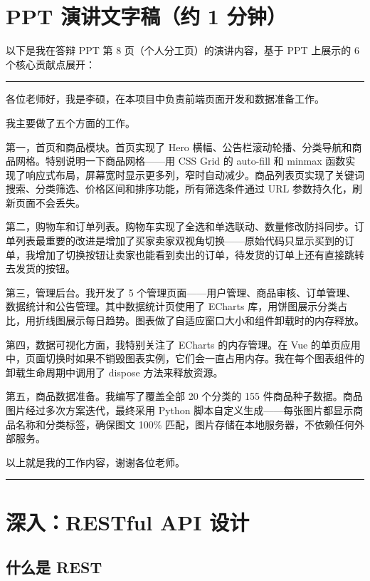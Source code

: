 \documentclass[12pt,a4paper]{ctexart}
\begin{document}
\section{PPT 演讲文字稿（约 1 分钟）}

以下是我在答辩 PPT 第 8 页（个人分工页）的演讲内容，基于 PPT 上展示的 6 个核心贡献点展开：

\medskip
\noindent\rule{\textwidth}{0.4pt}
\medskip

各位老师好，我是李硕，在本项目中负责前端页面开发和数据准备工作。

我主要做了五个方面的工作。

第一，首页和商品模块。首页实现了 Hero 横幅、公告栏滚动轮播、分类导航和商品网格。特别说明一下商品网格——用 CSS Grid 的 auto-fill 和 minmax 函数实现了响应式布局，屏幕宽时显示更多列，窄时自动减少。商品列表页实现了关键词搜索、分类筛选、价格区间和排序功能，所有筛选条件通过 URL 参数持久化，刷新页面不会丢失。

第二，购物车和订单列表。购物车实现了全选和单选联动、数量修改防抖同步。订单列表最重要的改进是增加了买家卖家双视角切换——原始代码只显示买到的订单，我增加了切换按钮让卖家也能看到卖出的订单，待发货的订单上还有直接跳转去发货的按钮。

第三，管理后台。我开发了 5 个管理页面——用户管理、商品审核、订单管理、数据统计和公告管理。其中数据统计页使用了 ECharts 库，用饼图展示分类占比，用折线图展示每日趋势。图表做了自适应窗口大小和组件卸载时的内存释放。

第四，数据可视化方面，我特别关注了 ECharts 的内存管理。在 Vue 的单页应用中，页面切换时如果不销毁图表实例，它们会一直占用内存。我在每个图表组件的卸载生命周期中调用了 dispose 方法来释放资源。

第五，商品数据准备。我编写了覆盖全部 20 个分类的 155 件商品种子数据。商品图片经过多次方案迭代，最终采用 Python 脚本自定义生成——每张图片都显示商品名称和分类标签，确保图文 100\% 匹配，图片存储在本地服务器，不依赖任何外部服务。

以上就是我的工作内容，谢谢各位老师。

\medskip
\noindent\rule{\textwidth}{0.4pt}
\medskip

\section{深入：RESTful API 设计}

\subsection{什么是 REST}
\end{document}
